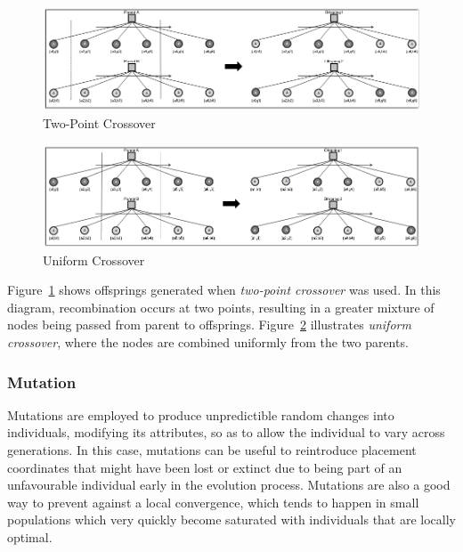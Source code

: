         \pagebreak
        
        \begin{figure}[htp]
            \begin{center}
            \includegraphics[scale=0.4]{images/recombination-b.png}
            \caption{Two-Point Crossover}
            \label{img:recombination-b}
            \end{center} 
        \end{figure}
        
        \begin{figure}[htp]
            \begin{center}
            \includegraphics[scale=0.4]{images/recombination-c.png}
            \caption{Uniform Crossover}
            \label{img:recombination-c}
            \end{center} 
        \end{figure}
        
        Figure~\ref{img:recombination-b} shows offsprings generated when \emph{two-point crossover} was used. In this diagram, recombination occurs at two points, resulting in a greater mixture of nodes being passed from parent to offsprings. Figure~\ref{img:recombination-c} illustrates \emph{uniform crossover}, where the nodes are combined uniformly from the two parents.
                
        \subsubsection{Mutation}
        
        Mutations are employed to produce unpredictible random changes into individuals, modifying its attributes, so as to allow the individual to vary across generations. In this case, mutations can be useful to reintroduce placement coordinates that might have been lost or extinct due to being part of an unfavourable individual early in the evolution process. Mutations are also a good way to prevent against a local convergence, which tends to happen in small populations which very quickly become saturated with individuals that are locally optimal.
    
